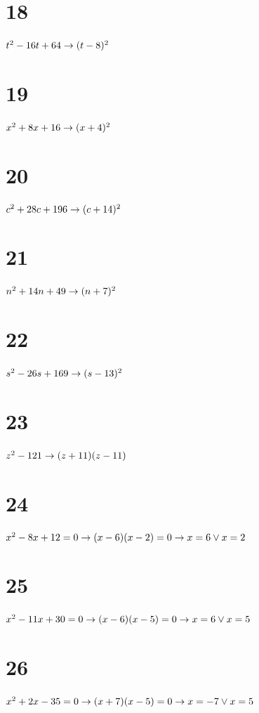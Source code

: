 \documentclass{article}
\theoremstyle{definition}
\begin{document}
\section*{18}
$t^2-16t+64\newline\rightarrow (t-8)^2$

\section*{19}
$x^2+8x+16\newline\rightarrow (x+4)^2$

\section*{20}
$c^2+28c+196\newline\rightarrow (c+14)^2$

\section*{21}
$n^2+14n+49\newline\rightarrow (n+7)^2$

\section*{22}
$s^2-26s+169\newline\rightarrow (s-13)^2$

\section*{23}
$z^2-121\newline\rightarrow (z+11)(z-11)$

\section*{24}
$x^2-8x+12=0\newline\rightarrow (x-6)(x-2)=0\newline\rightarrow x=6\vee x=2$

\section*{25}
$x^2-11x+30=0\newline\rightarrow (x-6)(x-5)=0\newline\rightarrow x=6\vee x=5$

\section*{26}
$x^2+2x-35=0\newline\rightarrow (x+7)(x-5)=0\newline\rightarrow x=-7\vee x=5$
\end{document}
